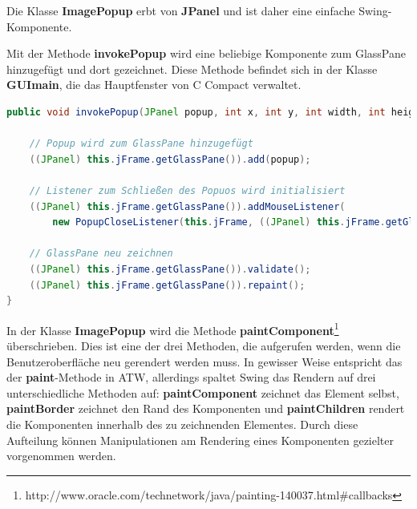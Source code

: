 Die Klasse \textbf{ImagePopup} erbt von \textbf{JPanel} und ist daher eine einfache Swing-Komponente. 

Mit der Methode \textbf{invokePopup} wird eine beliebige Komponente zum GlassPane hinzugefügt und dort gezeichnet. Diese Methode befindet sich in der Klasse \textbf{GUImain}, die das Hauptfenster von C Compact verwaltet.
\begin{lstlisting}[language=JAVA]
public void invokePopup(JPanel popup, int x, int y, int width, int height) {

	// Popup wird zum GlassPane hinzugefügt
	((JPanel) this.jFrame.getGlassPane()).add(popup);
	
	// Listener zum Schließen des Popuos wird initialisiert
	((JPanel) this.jFrame.getGlassPane()).addMouseListener(
		new PopupCloseListener(this.jFrame, ((JPanel) this.jFrame.getGlassPane()), popup, x, y, width, height));
		
	// GlassPane neu zeichnen
	((JPanel) this.jFrame.getGlassPane()).validate();
	((JPanel) this.jFrame.getGlassPane()).repaint();
}
\end{lstlisting}

In der Klasse \textbf{ImagePopup} wird die Methode \textbf{paintComponent}\footnote{http://www.oracle.com/technetwork/java/painting-140037.html\#callbacks} überschrieben. Dies ist eine der drei Methoden, die aufgerufen werden, wenn die Benutzeroberfläche neu gerendert werden muss. In gewisser Weise entspricht das der \textbf{paint}-Methode in ATW, allerdings spaltet Swing das Rendern auf drei unterschiedliche Methoden auf: \textbf{paintComponent} zeichnet das Element selbst, \textbf{paintBorder} zeichnet den Rand des Komponenten und \textbf{paintChildren} rendert die Komponenten innerhalb des zu zeichnenden Elementes. Durch diese Aufteilung können Manipulationen am Rendering eines Komponenten gezielter vorgenommen werden.

